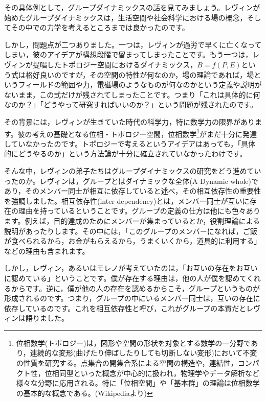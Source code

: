 \documentclass{ltjsbook}
\begin{document}
その具体例として，グループダイナミックスの話を見てみましょう。レヴィンが始めたグループダイナミックスは，生活空間や社会科学における場の概念，そしてその中での力学を考えるところまでは良かったのです。

しかし，問題点が二つありました。一つは，レヴィンが過労で早くに亡くなってしまい，彼のアイデアが構想段階で留まってしまったことです。もう一つは，レヴィンが提唱したトポロジー空間におけるダイナミックス，$B=f(P,E)$という式は格好良いのですが，その空間の特性が何なのか，場の理論であれば，場というフィールドの範囲や力，電磁場のようなものが何なのかという定義や説明がないまま，この式だけが残されてしまったことです。つまり「これは具体的に何なのか？」「どうやって研究すればいいのか？」という問題が残されたのです。

その背景には，レヴィンが生きていた時代の科学力，特に数学力の限界があります。彼の考えの基礎となる位相・トポロジー空間，位相数学\footnote{位相数学(トポロジー)は，図形や空間の形状を対象とする数学の一分野であり，連続的な変形(曲げたり伸ばしたりしても切断しない変形)において不変の性質を研究する。点集合の開集合系による空間の構造や，連結性，コンパクト性，位相同型といった概念が中心的に扱われ，物理学やデータ解析など様々な分野に応用される。特に「位相空間」や「基本群」の理論は位相数学の基本的な概念である。(Wikipediaより)}がまだ十分に発達していなかったのです。トポロジーで考えるというアイデアはあっても，「具体的にどうやるのか」という方法論が十分に確立されていなかったわけです。

そんな中，レヴィンの弟子たちはグループダイナミックスの研究をどう進めていったのか。レヴィンは，グループとはダイナミックな全体(A Dynamic whole)であり，そのメンバー同士が相互に依存していると述べ，その相互依存性の重要性を強調しました。相互依存性(inter-dependency)とは，メンバー同士が互いに存在の理由を持っているということです。グループの定義の仕方は他にも色々あります。例えば，目的達成のためにメンバーが集まっているとか，役割理論による説明があったりします。その中には，「このグループのメンバーになれば，ご飯が食べられるから，お金がもらえるから，うまくいくから，道具的に利用する」などの理由も含まれます。

しかし，レヴィン，あるいはモレノが考えていたのは，「お互いの存在をお互いに認めている」ということです。僕が存在する理由は，他の人が僕を認めてくれるからです。逆に，僕が他の人の存在を認めるからこそ，グループというものが形成されるのです。つまり，グループの中にいるメンバー同士は，互いの存在に依存しているのです。これを相互依存性と呼び，これがグループの本質だとレヴィンは語りました。
\end{document}
